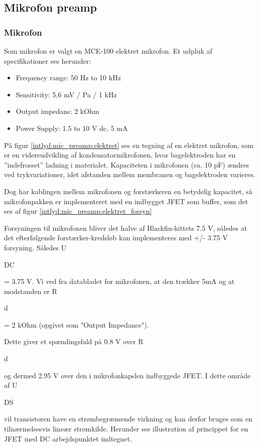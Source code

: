 
\subsection*{Mikrofon preamp}

\subsubsection{Mikrofon} 
Som mikrofon er valgt en MCE-100 elektret mikrofon. Et udpluk af specifikationer ses herunder:
\begin{itemize}
	\item Frequency range: 50 Hz to 10 kHz
	\item Sensitivity: 5,6 mV / Pa / 1 kHz
	\item Output impedans: 2 kOhm
	\item Power Supply: 1.5 to 10 V dc, 5 mA
\end{itemize}
 
På figur \ref{intlyd:mic_preamp:elektret} ses en tegning af en elektret mikrofon, som er en videreudvikling af kondensatormikrofonen, hvor bagelektroden har en ''indefrosset'' ladning i materialet. Kapaciteten i mikrofonen (ca. 10 pF) ændres ved trykvariationer, idet afstanden mellem membranen og bagelektroden varieres. 


Dog har kablingen mellem mikrofonen og forstærkeren en betydelig kapacitet, så mikrofonpakken er implementeret med en indbygget JFET som buffer, som det ses af figur \ref{intlyd:mic_preamp:elektret_forsyn}

Forsyningen til mikrofonen bliver det halve af Blackfin-kittets 7.5 V, således at det efterfølgende forstærker-kredsløb kan implementeres med +/- 3.75 V forsyning. Således U\begin{tiny}DC\end{tiny} = 3.75 V. 
Vi ved fra databladet for mikrofonen, at den trækker 5mA og at modstanden er R\begin{tiny}d\end{tiny} = 2 kOhm (opgivet som "Output Impedance").

Dette giver et spændingsfald på 0.8 V over R\begin{tiny}d\end{tiny} og dermed 2.95 V over den i mikrofonkapslen indbyggede JFET. I dette område af U\begin{tiny}DS\end{tiny} vil transistoren have en strømbegrænsende virkning og kan derfor bruges som en tilnærmelsesvis lineær strømkilde. Herunder ses illustration af princippet for en JFET med DC arbejdspunktet indtegnet.

